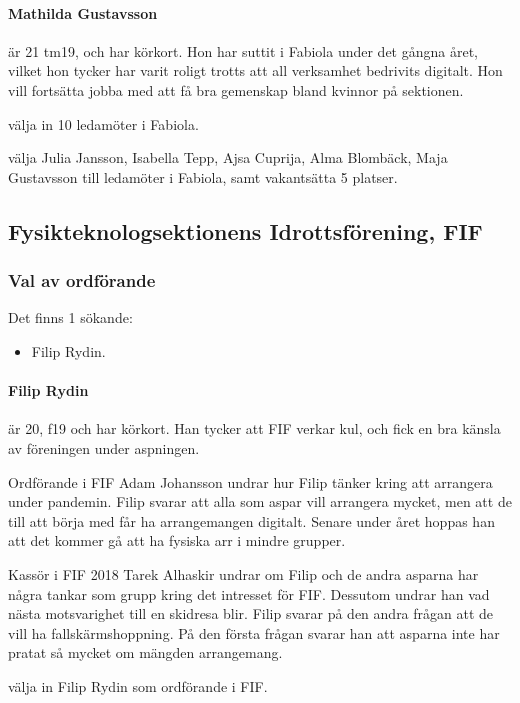 \documentclass[hidelinks]{sektionsmote}
\begin{document}
\paragraph{Mathilda Gustavsson} är 21 tm19, och har körkort.
Hon har suttit i Fabiola under det gångna året, vilket hon tycker har varit roligt trotts att all verksamhet bedrivits digitalt.
Hon vill fortsätta jobba med att få bra gemenskap bland kvinnor på sektionen.

\begin{beslut}
  \item välja in 10 ledamöter i Fabiola.
  \item välja Julia Jansson, Isabella Tepp, Ajsa Cuprija, Alma Blombäck, Maja Gustavsson till ledamöter i Fabiola, samt vakantsätta 5 platser.
\end{beslut}


\subsection{Fysikteknologsektionens Idrottsförening, FIF}
\subsubsection{Val av ordförande}
Det finns 1 sökande:
\begin{itemize}
    \item Filip Rydin.
\end{itemize}

\paragraph{Filip Rydin} är 20, f19 och har körkort.
Han tycker att FIF verkar kul, och fick en bra känsla av föreningen under aspningen.

Ordförande i FIF Adam Johansson undrar hur Filip tänker kring att arrangera under pandemin.
Filip svarar att alla som aspar vill arrangera mycket, men att de till att börja med får ha arrangemangen digitalt.
Senare under året hoppas han att det kommer gå att ha fysiska arr i mindre grupper.

Kassör i FIF 2018 Tarek Alhaskir undrar om Filip och de andra asparna har några tankar som grupp kring det intresset för FIF.
Dessutom undrar han vad nästa motsvarighet till en skidresa blir.
Filip svarar på den andra frågan att de vill ha fallskärmshoppning.
På den första frågan svarar han att asparna inte har pratat så mycket om mängden arrangemang.

\begin{beslut}
  \item välja in Filip Rydin som ordförande i FIF.
\end{beslut}
\end{document}
